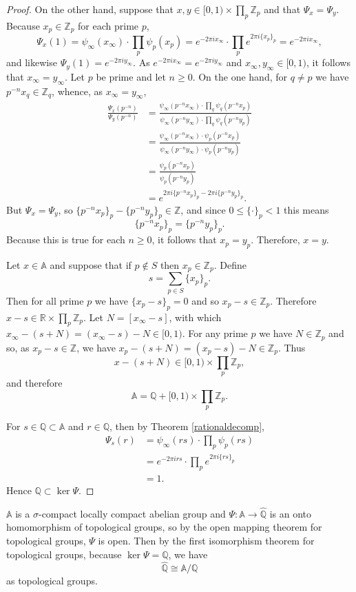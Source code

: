 \documentclass{article}
\theoremstyle{definition}
\begin{document}
\begin{proof}
On the other hand, suppose that $x,y \in [0,1) \times \prod_p \mathbb{Z}_p$ and that
$\Psi_x=\Psi_y$. Because $x_p \in \mathbb{Z}_p$ for each prime $p$,
\[
\Psi_x(1) = \psi_\infty(x_\infty) \cdot \prod_p \psi_p(x_p) =
e^{-2\pi ix_\infty} \cdot \prod_p e^{2\pi i\{x_p\}_p}
=e^{-2\pi ix_\infty},
\]
and likewise $\Psi_y(1)=e^{-2\pi iy_\infty}$. As $e^{-2\pi ix_\infty}=e^{-2\pi iy_\infty}$ and
$x_\infty,y_\infty \in [0,1)$, it follows that $x_\infty=y_\infty$. 
Let $p$ be prime and let $n \geq 0$. On the one hand, for
$q \neq p$ we have $p^{-n}x_q \in \mathbb{Z}_q$, whence, as $x_\infty=y_\infty$,
\begin{align*}
\frac{\Psi_x(p^{-n})}{\Psi_y(p^{-n})} &= \frac{\psi_\infty(p^{-n}x_\infty) \cdot \prod_q \psi_q(p^{-n}x_p)}{ \psi_\infty(p^{-n}y_\infty) \cdot \prod_q \psi_q(p^{-n}y_p)}\\
&=\frac{\psi_\infty(p^{-n}x_\infty) \cdot \psi_p(p^{-n}x_p)}{\psi_\infty(p^{-n}y_\infty) \cdot \psi_p(p^{-n}y_p)}\\
&=\frac{\psi_p(p^{-n}x_p)}{\psi_p(p^{-n}y_p)}\\
&=e^{2\pi i\{p^{-n}x_p\}_p-2\pi i\{p^{-n}y_p\}_p}.
\end{align*}
But $\Psi_x=\Psi_y$, so $\{p^{-n}x_p\}_p-\{p^{-n}y_p\}_p \in \mathbb{Z}$, and since $0 \leq \{\cdot\}_p < 1$ this means
\[
\{p^{-n}x_p\}_p=\{p^{-n}y_p\}_p.
\]
Because this is true for each $n \geq 0$, it follows that $x_p=y_p$. Therefore, $x=y$.

Let $x \in \mathbb{A}$ and suppose that if $p \not \in S$ then $x_p \in \mathbb{Z}_p$. Define
\[
s = \sum_{p \in S} \{x_p\}_p.
\]
Then for all prime $p$ we have $\{x_p-s\}_p = 0$ and  so $x_p-s \in \mathbb{Z}_p$. Therefore
$x-s \in \mathbb{R} \times \prod_p \mathbb{Z}_p$. Let $N=[x_\infty-s]$, with which 
$x_\infty-(s+N)=(x_\infty-s)-N \in [0,1)$. 
For any prime $p$ we have
$N \in \mathbb{Z}_p$ and so, as $x_p-s \in \mathbb{Z}$, we have
$x_p-(s+N)=(x_p-s)-N \in \mathbb{Z}_p$. Thus 
\[
x-(s+N) \in [0,1) \times \prod_p \mathbb{Z}_p,
\]
and therefore
\[
\mathbb{A}=\mathbb{Q} + [0,1) \times \prod_p \mathbb{Z}_p.
\]


For $s \in \mathbb{Q} \subset \mathbb{A}$ and $r \in \mathbb{Q}$, then by Theorem \ref{rationaldecomp},
\begin{align*}
\Psi_s(r) &=   \psi_\infty(rs) \cdot \prod_p \psi_p(rs)\\
&=e^{-2\pi irs} \cdot \prod_p e^{2\pi i \{rs\}_p}\\
&=1.
\end{align*}
Hence $\mathbb{Q} \subset \ker \Psi$.
\end{proof}


$\mathbb{A}$ is a $\sigma$-compact locally compact abelian group and
$\Psi:\mathbb{A} \to \widehat{\mathbb{Q}}$ is an onto homomorphism of topological groups,
so by the open mapping theorem for topological groups, $\Psi$ is open. Then by the
first isomorphism theorem for topological groups, because $\ker \Psi = \mathbb{Q}$, we have
\[
\widehat{\mathbb{Q}} \cong \mathbb{A}/\mathbb{Q}
\]
as topological groups.
\end{document}
